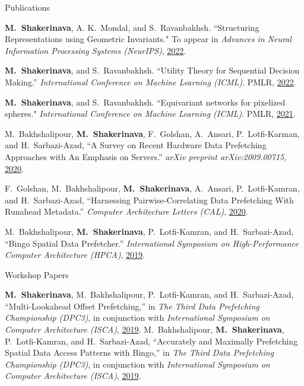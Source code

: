\documentclass{resume}
\newcommand{\InternalSpace}{\vspace{0.18cm}}
\newenvironment{MySection}[1]
{\begin{category}{#1}}
{\end{category}}
\newcommand{\MyItem}{\citembullet}
\begin{document}
\begin{MySection}{Publications}

\MyItem \textbf{M.~Shakerinava}, A. K.~Mondal, and S.~Ravanbakhsh. {``Structuring Representations using Geometric Invariants."} To appear in \textit{Advances in Neural Information Processing Systems (NeurIPS)}, \href{https://openreview.net/pdf?id=vWUmBjin_-o}{2022}.

\MyItem \textbf{M.~Shakerinava}, and S.~Ravanbakhsh. {``Utility Theory for Sequential Decision Making.''} \textit{International Conference on Machine Learning (ICML)}. PMLR, \href{https://proceedings.mlr.press/v162/shakerinava22a/shakerinava22a.pdf}{2022}.

\MyItem \textbf{M.~Shakerinava}, and S.~Ravanbakhsh. {``Equivariant networks for pixelized spheres."} \textit{International Conference on Machine Learning (ICML)}. PMLR, \href{http://proceedings.mlr.press/v139/shakerinava21a/shakerinava21a.pdf}{2021}.

\MyItem M.~Bakhshalipour, \textbf{M.~Shakerinava}, F.~Golshan, A.~Ansari, P.~Lotfi-Karman, and H.~Sarbazi-Azad, {``A Survey on Recent Hardware Data Prefetching Approaches with An Emphasis on Servers.''} \textit{arXiv preprint arXiv:2009.00715}, \href{https://arxiv.org/pdf/2009.00715.pdf}{2020}.

\MyItem F.~Golshan, M.~Bakhshalipour, \textbf{M.~Shakerinava}, A.~Ansari, P.~Lotfi-Kamran, and H.~Sarbazi-Azad, {``Harnessing Pairwise-Correlating Data Prefetching With Runahead Metadata.''} \textit{Computer Architecture Letters (CAL)}, \href{https://ieeexplore.ieee.org/abstract/document/9177277}{2020}.

\MyItem M.~Bakhshalipour, \textbf{M.~Shakerinava}, P.~Lotfi-Kamran, and H.~Sarbazi-Azad, {``Bingo Spatial Data Prefetcher.''} \textit{International Symposium on High-Performance Computer Architecture (HPCA)}, \href{https://cs.ipm.ac.ir/~plotfi/papers/bingo_hpca19.pdf}{2019}.

\end{MySection}

\InternalSpace

\begin{MySection}{Workshop Papers}

\MyItem \textbf{M.~Shakerinava}, M.~Bakhshalipour, P.~Lotfi-Kamran, and H.~Sarbazi-Azad, {``Multi-Lookahead Offset Prefetching,''} in \textit{The Third Data Prefetching Championship (DPC3)}, in conjunction with \textit{International Symposium on Computer Architecture (ISCA)}, \href{https://dpc3.compas.cs.stonybrook.edu/pdfs/Multi_lookahead.pdf}{2019}.
\MyItem M.~Bakhshalipour, \textbf{M.~Shakerinava}, P.~Lotfi-Kamran, and H.~Sarbazi-Azad, {``Accurately and Maximally Prefetching Spatial Data Access Patterns with Bingo,''} in \textit{The Third Data Prefetching Championship (DPC3)}, in conjunction with \textit{International Symposium on Computer Architecture (ISCA)}, \href{https://dpc3.compas.cs.stonybrook.edu/pdfs/Accurately.pdf}{2019}.

\end{MySection}
\end{document}
